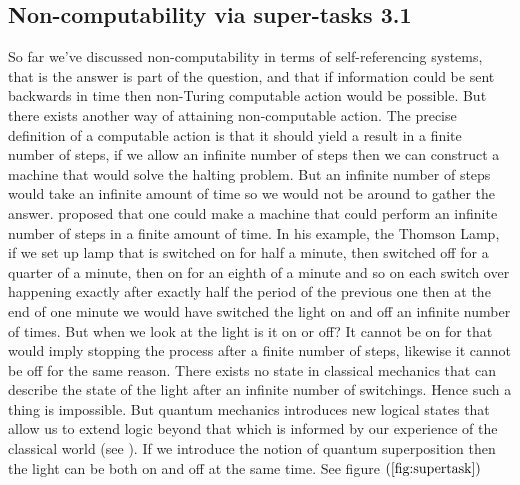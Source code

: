 \documentclass[
   ,final            %
  ]
  {aipproc}
\begin{document}
\subsection{Non-computability via super-tasks 3.1}
\par
So far we've discussed non-computability in terms of self-referencing systems, that is the answer is part of
the question, and that if information could be sent backwards in time then non-Turing computable action
would be possible. But there exists another way of attaining non-computable action. The precise definition
of a computable action is that it should yield a result in a finite number of steps, if we allow an infinite
number of steps then we can construct a machine that would solve the halting problem. But an infinite
number of steps would take an infinite amount of time so we would not be around to gather the answer.
\citet{Thomson_1954} proposed that one could make a machine that could perform an infinite number of steps in a
finite amount of time. In his example, the Thomson Lamp, if we set up lamp that is switched on for half a
minute, then switched off for a quarter of a minute, then on for an eighth of a minute and so on each switch
over happening exactly after exactly half the period of the previous one then at the end of one minute we
would have switched the light on and off an infinite number of times. But when we look at the light is it on
or off? It cannot be on for that would imply stopping the process after a finite number of steps, likewise it
cannot be off for the same reason. There exists no state in classical mechanics that can describe the state of
the light after an infinite number of switchings. Hence such a thing is impossible. But quantum mechanics
introduces new logical states that allow us to extend logic beyond that which is informed by our experience
of the classical world (see \citet{deutsch_ekert_lupacchini_00}). If we introduce the notion of quantum superposition then the light can be both
on and off at the same time. See figure $(\ref{fig:supertask})$ 
\end{document}
